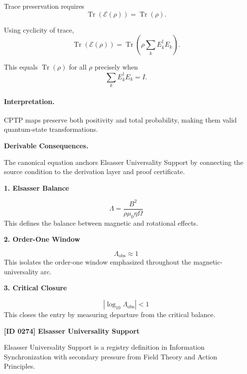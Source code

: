 Trace preservation requires
\begin{equation}
\operatorname{Tr}(\mathcal{E}(\rho))=\operatorname{Tr}(\rho).
\end{equation}

Using cyclicity of trace,
\begin{equation}
\operatorname{Tr}(\mathcal{E}(\rho))
=
\operatorname{Tr}\left(
\rho\sum_k E_k^\dagger E_k
\right).
\end{equation}

This equals $\operatorname{Tr}(\rho)$ for all $\rho$ precisely when
\begin{equation}
\boxed{
\sum_k E_k^\dagger E_k = I .
}
\end{equation}

\paragraph{Interpretation.}
CPTP maps preserve both positivity and total probability, making them valid quantum-state transformations.

\par\vspace{0.35em}
\noindent\textbf{Derivable Consequences.}\quad
\begingroup
\footnotesize
\raggedright
The canonical equation anchors Elsasser Universality Support by connecting the source condition to the derivation layer and proof certificate.
\par\endgroup

\noindent\textbf{1. Elsasser Balance}\par
\[
\Lambda=\frac{B^2}{\rho\mu_0\eta\Omega}
\]
\noindent This defines the balance between magnetic and rotational effects.\par
\noindent\textbf{2. Order-One Window}\par
\[
\Lambda_{\mathrm{obs}}\approx 1
\]
\noindent This isolates the order-one window emphasized throughout the magnetic-universality arc.\par
\noindent\textbf{3. Critical Closure}\par
\[
|\log_{10}\Lambda_{\mathrm{obs}}|<1
\]
\noindent This closes the entry by measuring departure from the critical balance.\par

\clearpage
\noindent\textbf{[ID 0274] Elsasser Universality Support}\par
\vspace{0.35em}
\begingroup\small
{}
Elsasser Universality Support is a registry definition in Information Synchronization with secondary pressure from Field Theory and Action Principles.


